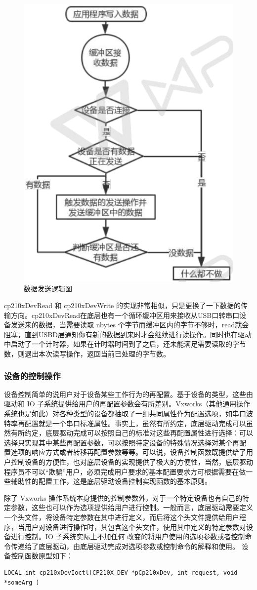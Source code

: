 \begin{figure}[!h]
\centering
\includegraphics[width=.4\textwidth]{./graphics/outData-diagram.pdf}
\caption{数据发送逻辑图}\label{fig:outData-diagram}
\end{figure}

cp210xDevRead 和 cp210xDevWrite 的实现非常相似，只是更换了一下数据的传输方向。cp210xDevRead在底层也有一个循环缓冲区用来接收从USB口转串口设备发送来的数据，当需要读取 nbytes 个字节而缓冲区内的字节不够时，read就会阻塞，直到USBD层通知你有新的数据到来时才会继续进行读操作。同时也在驱动中启动了一个计时器，如果在计时器时间到了之后，还未能满足需要读取的字节数，则退出本次读写操作，返回当前已处理的字节数。


\subsubsection{设备的控制操作}
	设备控制简单的说用户对于设备某些工作行为的再配置。基于设备的类型，这些由驱动和 IO 子系统提供给用户的再配置参数会有所差别。Vxworks（其他通用操作系统也是如此）对各种类型的设备都抽取了一组共同属性作为配置选项，如串口波特率再配置就是一个串口标准属性。事实上，虽然有所约定，底层驱动完成可以虽然有所约定，底层驱动完成可以按照自己的标准对这些再配置属性进行选择：可以选择只实现其中某些再配置参数，可以按照特定设备的特殊情况选择对某个再配
置选项的响应方式或者转移再配置参数等等。可以说，设备控制函数既提供给了用户控制设备的方便性，也对底层设备的实现提供了极大的方便性，当然，底层驱动程序员不可以“欺骗”用户，必须完成用户要求的基本配置要求方可根据需要在做一些辅助性的配置工作，这是底层驱动设备控制实现函数的基本原则。

	除了 Vxworks 操作系统本身提供的控制参数外，对于一个特定设备也有自己的特定参数，这些也可以作为选项提供给用户进行控制。一般而言，底层驱动需要定义一个头文件，将设备特定参数在其中进行定义，而后将这个头文件提供给用户程序，当用户对设备进行操作时，其包含这个头文件，使用其中定义的特定参数对设备进行控制。IO 子系统实际上不加任何
改变的将用户使用的选项参数或者控制命令传递给了底层驱动，由底层驱动完成对选项参数或控制命令的解释和使用。
设备控制函数原型如下：
\lstset{language=C}
\begin{lstlisting}
LOCAL int cp210xDevIoctl(CP210X_DEV *pCp210xDev, int request, void *someArg )
\end{lstlisting}

